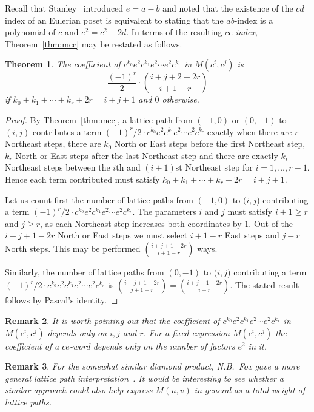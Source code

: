 \documentclass[reqno,12pt]{amsart}
\numberwithin{equation}{section}
\newtheorem{theorem}{Theorem}[section]
\newtheorem{remark}[theorem]{Remark}
\newcommand{\0}{\widehat{0}}
\newcommand{\1}{\widehat{1}}
\newcommand{\2}{\widehat{2}}
\begin{document}
Recall that Stanley~\cite{Stanley-flag} introduced $e=a-b$ and noted
that the existence of the $cd$ index of an Eulerian poset is equivalent to
stating that the $ab$-index is a polynomial of $c$ and $e^2=c^2-2d$. In
terms of the resulting {\em $ce$-index}, Theorem~\ref{thm:mcc}  may be
restated as follows.
\begin{theorem}
\label{thm:mcce}  
The coefficient of $c^{k_0}e^2c^{k_1}e^2\cdots e^2c^{k_r}$ in
$M(c^i,c^j)$ is
$$
\frac{(-1)^r}{2}\cdot \binom{i+j+2-2r}{i+1-r}
$$
if $k_0+k_1+\cdots+k_r+2r=i+j+1$ and $0$ otherwise.  
\end{theorem}
\begin{proof}
By Theorem~\ref{thm:mcc}, a lattice path from $(-1,0)$ or $(0,-1)$ to
$(i,j)$ contributes a term $(-1)^r/2\cdot c^{k_0}e^2c^{k_1}e^2\cdots
e^2c^{k_r}$ exactly when there are $r$ Northeast steps, there are $k_0$
North or East steps before the first Northeast step, $k_r$ North or East
steps after the last Northeast step and there are exactly $k_i$
Northeast steps between the $i$th and $(i+1)$st Northeast step for
$i=1,\ldots,r-1$. Hence each term contributed must satisfy
$k_0+k_1+\cdots+k_r+2r=i+j+1$. 

Let us count first the number of lattice paths from $(-1,0)$ to $(i,j$)
contributing a term $(-1)^r/2\cdot 
c^{k_0}e^2c^{k_1}e^2\cdots e^2c^{k_r}$. The parameters $i$ and $j$ must
satisfy $i+1\geq r$ and $j\geq r$, as each Northeast step increases both
coordinates by $1$. Out of the $i+j+1-2r$ North or East steps we must
select $i+1-r$ East steps and $j-r$ North steps. This may be performed
$\binom{i+j+1-2r}{i+1-r}$ ways.

Similarly, the number of lattice paths from $(0,-1)$ to $(i,j$)
contributing a term $(-1)^r/2\cdot 
c^{k_0}e^2c^{k_1}e^2\cdots e^2c^{k_r}$ is
$\binom{i+j+1-2r}{j+1-r}=\binom{i+j+1-2r}{i-r}$. The stated result
follows by Pascal's identity.
\end{proof}  

\begin{remark}
{\em It is worth pointing out that the coefficient of
  $c^{k_0}e^2c^{k_1}e^2\cdots e^2c^{k_r}$ in $M(c^i,c^j)$ depends only
  on $i,j$ and $r$. For a fixed expression  $M(c^i,c^j)$ the
  coefficient of a $ce$-word depends only on the number of factors $e^2$
  in it.} 
\end{remark}   


\begin{remark}
{\em For the somewhat similar diamond product, N.B.\ Fox gave a more general
lattice path interpretation~\cite[Theorem 5.4]{Fox}. It would be
interesting to see whether a similar approach could also help express
$M(u,v)$ in general as a total weight of lattice paths.} 
\end{remark}   
\end{document}
